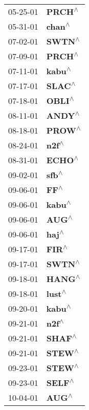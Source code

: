 \begin{supertabular}{p{0.08\textwidth}p{0.2\textwidth}}
 05-25-01 &    \textbf{PRCH\textsuperscript{$\wedge$}} \\
 05-31-01 &    \textbf{chan\textsuperscript{$\wedge$}} \\
 07-02-01 &    \textbf{SWTN\textsuperscript{$\wedge$}} \\
 07-09-01 &    \textbf{PRCH\textsuperscript{$\wedge$}} \\
 07-11-01 &    \textbf{kabu\textsuperscript{$\wedge$}} \\
 07-17-01 &    \textbf{SLAC\textsuperscript{$\wedge$}} \\
 07-18-01 &    \textbf{OBLI\textsuperscript{$\wedge$}} \\
 08-11-01 &    \textbf{ANDY\textsuperscript{$\wedge$}} \\
 08-18-01 &    \textbf{PROW\textsuperscript{$\wedge$}} \\
 08-24-01 &     \textbf{n2f\textsuperscript{$\wedge$}} \\
 08-31-01 &    \textbf{ECHO\textsuperscript{$\wedge$}} \\
 09-02-01 &     \textbf{sfb\textsuperscript{$\wedge$}} \\
 09-06-01 &      \textbf{FF\textsuperscript{$\wedge$}} \\
 09-06-01 &    \textbf{kabu\textsuperscript{$\wedge$}} \\
 09-06-01 &     \textbf{AUG\textsuperscript{$\wedge$}} \\
 09-06-01 &     \textbf{haj\textsuperscript{$\wedge$}} \\
 09-17-01 &     \textbf{FIR\textsuperscript{$\wedge$}} \\
 09-17-01 &    \textbf{SWTN\textsuperscript{$\wedge$}} \\
 09-18-01 &    \textbf{HANG\textsuperscript{$\wedge$}} \\
 09-18-01 &    \textbf{lust\textsuperscript{$\wedge$}} \\
 09-20-01 &    \textbf{kabu\textsuperscript{$\wedge$}} \\
 09-21-01 &     \textbf{n2f\textsuperscript{$\wedge$}} \\
 09-21-01 &    \textbf{SHAF\textsuperscript{$\wedge$}} \\
 09-21-01 &    \textbf{STEW\textsuperscript{$\wedge$}} \\
 09-23-01 &    \textbf{STEW\textsuperscript{$\wedge$}} \\
 09-23-01 &    \textbf{SELF\textsuperscript{$\wedge$}} \\
 10-04-01 &     \textbf{AUG\textsuperscript{$\wedge$}} \\

\end{supertabular}
